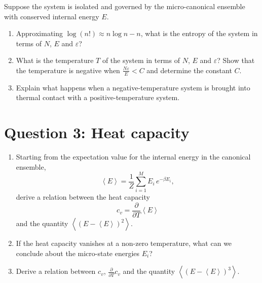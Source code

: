\documentclass[12 pt]{article} %
\newcommand{\be}{\ensuremath{\beta} }
\newcommand{\eps}{\ensuremath{\varepsilon} }
\newcommand{\vev}[1]{\ensuremath{\left\langle #1 \right\rangle} }
\newcommand{\pderiv}[2]{\ensuremath{\frac{\partial #1}{\partial #2}} }
\newcommand{\showmarks}[1]{\rightline{\texttt{[#1 marks]}}} %
\begin{document}
Suppose the system is isolated and governed by the micro-canonical ensemble with conserved internal energy $E$.

\begin{enumerate}[label={(\alph*)}]
  \item Approximating $\log(n!) \approx n\log n - n$, what is the entropy of the system in terms of $N$, $E$ and $\eps$?

  \showmarks{8}

  \item What is the temperature $T$ of the system in terms of $N$, $E$ and $\eps$?
        Show that the temperature is negative when $\frac{N\eps}{E} < C$ and determine the constant $C$.

  \showmarks{8}

  \item Explain what happens when a negative-temperature system is brought into thermal contact with a positive-temperature system.

  \showmarks{8}
\end{enumerate}



\newpage
\section*{Question 3: Heat capacity}
\begin{enumerate}[label={(\alph*)}]
  \item Starting from the expectation value for the internal energy in the canonical ensemble,
        \begin{equation*}
          \vev{E} = \frac{1}{Z} \sum_{i = 1}^M E_i \, e^{-\be E_i},
        \end{equation*}
        derive a relation between the heat capacity
        \begin{equation*}
          c_v = \pderiv{}{T} \vev{E}
        \end{equation*}
        and the quantity $\vev{\left(E - \vev{E}\right)^2}$.

  \showmarks{10}

  \item If the heat capacity vanishes at a non-zero temperature, what can we conclude about the micro-state energies $E_i$?

  \showmarks{4}

  \item Derive a relation between $c_v$, $\pderiv{}{T} c_v$ and the quantity $\vev{\left(E - \vev{E}\right)^3}$.

  \showmarks{10}
\end{enumerate}
\end{document}
